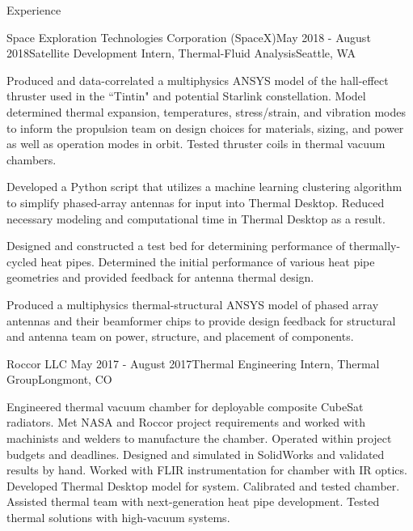 \documentclass{resume} %
\begin{document}
\begin{rSection}{Experience}
	\begin{rSubsection}{Space Exploration Technologies Corporation (SpaceX)}{May 2018 - August 2018}{Satellite Development Intern, Thermal-Fluid Analysis}{Seattle, WA}
	\item {\small Produced and data-correlated a multiphysics ANSYS model of the hall-effect thruster used in the ``Tintin" and potential Starlink constellation. Model determined thermal expansion, temperatures, stress/strain, and vibration modes to inform the propulsion team on design choices for materials, sizing, and power as well as operation modes in orbit. Tested thruster coils in thermal vacuum chambers.}
	\item{\small Developed a Python script that utilizes a machine learning clustering algorithm to simplify phased-array antennas for input into Thermal Desktop. Reduced necessary modeling and computational time in Thermal Desktop as a result.}
	\item{\small Designed and constructed a test bed for determining performance of thermally-cycled heat pipes. Determined the initial performance of various heat pipe geometries and provided feedback for antenna thermal design. }
	\item{\small Produced a multiphysics thermal-structural ANSYS model of phased array antennas and their beamformer chips to provide design feedback for structural and antenna team on power, structure, and placement of components.}
\end{rSubsection}


\begin{rSubsection}{Roccor LLC }{May 2017 - August 2017}{Thermal Engineering Intern, Thermal Group}{Longmont, CO}
\item {\small Engineered thermal vacuum chamber for deployable composite CubeSat radiators. Met NASA and Roccor project requirements and worked with machinists and welders to manufacture the chamber. Operated within project budgets and deadlines. Designed and simulated in SolidWorks and validated results by hand. Worked with FLIR instrumentation for chamber with IR optics. Developed Thermal Desktop model for system. Calibrated and tested chamber. Assisted thermal team with next-generation heat pipe development. Tested thermal solutions with high-vacuum systems.}
\end{rSubsection}


\end{rSection}
\end{document}
